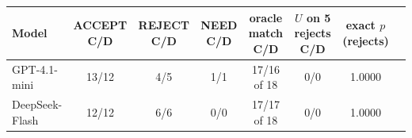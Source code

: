 \begin{tabular}{lccccccc}
\toprule
Model & ACCEPT C/D & REJECT C/D & NEED C/D & oracle match C/D & $U$ on 5 rejects C/D & exact $p$ (rejects) \\
\midrule
GPT-4.1-mini & 13/12 & 4/5 & 1/1 & 17/16 of 18 & 0/0 & 1.0000 \\
DeepSeek-Flash & 12/12 & 6/6 & 0/0 & 17/17 of 18 & 0/0 & 1.0000 \\
\bottomrule
\end{tabular}
